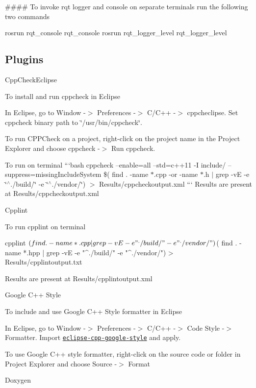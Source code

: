\#\#\#\# To invoke rqt logger and console on separate terminals run the following two commands 
\begin{DoxyCode}
rosrun rqt\_console rqt\_console
rosrun rqt\_logger\_level rqt\_logger\_level
\end{DoxyCode}


\subsection*{Plugins}


\begin{DoxyItemize}
\item Cpp\+Check\+Eclipse

To install and run cppcheck in Eclipse
\begin{DoxyEnumerate}
\item In Eclipse, go to Window -\/$>$ Preferences -\/$>$ C/\+C++ -\/$>$ cppcheclipse. Set cppcheck binary path to \char`\"{}/usr/bin/cppcheck\char`\"{}.
\item To run C\+P\+P\+Check on a project, right-\/click on the project name in the Project Explorer and choose cppcheck -\/$>$ Run cppcheck.
\item To run on terminal ```bash cppcheck --enable=all --std=c++11 -\/I include/ --suppress=missing\+Include\+System \$( find . -\/name $\ast$.cpp -\/or -\/name $\ast$.h $\vert$ grep -\/vE -\/e \char`\"{}$^\wedge$./build/\char`\"{} -\/e \char`\"{}$^\wedge$./vendor/\char`\"{}) $>$ Results/cppcheckoutput.\+xml ``` Results are present at Results/cppcheckoutput.\+xml
\end{DoxyEnumerate}
\item Cpplint
\begin{DoxyEnumerate}
\item To run cpplint on terminal 
\begin{DoxyCode}
cpplint $( find . -name *.cpp | grep -vE -e "^./build/" -e "^./vendor/") $( find . -name *.hpp | grep -vE
       -e "^./build/" -e "^./vendor/") >                    Results/cpplintoutput.txt
\end{DoxyCode}
 Results are present at Results/cpplintoutput.\+xml
\end{DoxyEnumerate}
\item Google C++ Style

To include and use Google C++ Style formatter in Eclipse
\begin{DoxyEnumerate}
\item In Eclipse, go to Window -\/$>$ Preferences -\/$>$ C/\+C++ -\/$>$ Code Style -\/$>$ Formatter. Import \href{https://raw.githubusercontent.com/google/styleguide/gh-pages/eclipse-cpp-google-style.xml}{\tt eclipse-\/cpp-\/google-\/style} and apply.
\item To use Google C++ style formatter, right-\/click on the source code or folder in Project Explorer and choose Source -\/$>$ Format
\end{DoxyEnumerate}
\item Doxygen


\end{DoxyItemize}
